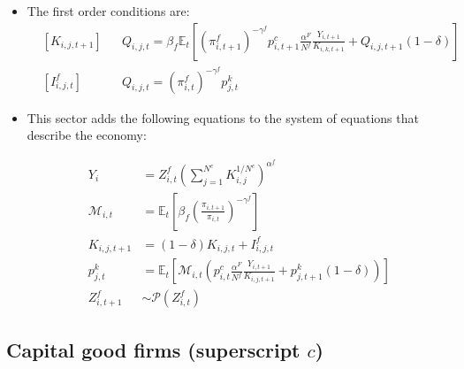 \documentclass[11pt]{article}
\newcommand{\E}{\mathbb{E}}
\numberwithin{equation}{section}
\begin{document}
\begin{itemize}
	\item The first order conditions are:
	\begin{align}
	& \left[K_{i,j,t+1}\right]
	&&
	Q_{i,j,t} =\beta_f \E_t \left[\left(\pi_{i,t+1}^f\right)^{-\gamma^f} p^c_{i,t+1} \frac{\alpha^F}{N^f} \frac{Y_{i,t+1}}{K_{i,k,t+1}} +Q_{i,j,t+1} (1-\delta) \right]
	\\
	& \left[ I^f_{i,j,t} \right]
	&&
	Q_{i,j,t} = \left(\pi_{i,t}^f\right)^{-\gamma^f} p^k_{j,t}
	\end{align}
	
	
	
	\item This sector adds the following equations to the system of equations that describe the economy:
	
	\begin{align}
	Y_i & = Z^f_{i,t} \left( \sum_{j=1}^{N^c } K^{1/N^c}_{i,j}\right)^{\alpha^f} \\
	\mathcal{M}_{i,t} & = \E_t \left[ \beta_f \left(\frac{\pi_{i,t+1}}{\pi_{i,t}}\right)^{-\gamma^f} \right] \\
	K_{i,j,t+1} & = (1-\delta) K_{i,j,t} + I^f_{i,j,t} \\
	p^k_{j,t} & =\E_t  \left[\mathcal{M}_{i,t} \left( p^c_{i,t} \frac{\alpha^F}{N^f} \frac{Y_{i,t+1}}{K_{i,j,t+1}} +  p^k_{j,t+1} (1-\delta) \right) \right] \\
	Z^f_{i,t+1} & \sim \mathcal{P}(Z^f_{i,t})
	\end{align}
	
\end{itemize}

\subsection{Capital good firms (superscript $c$)}
\end{document}
